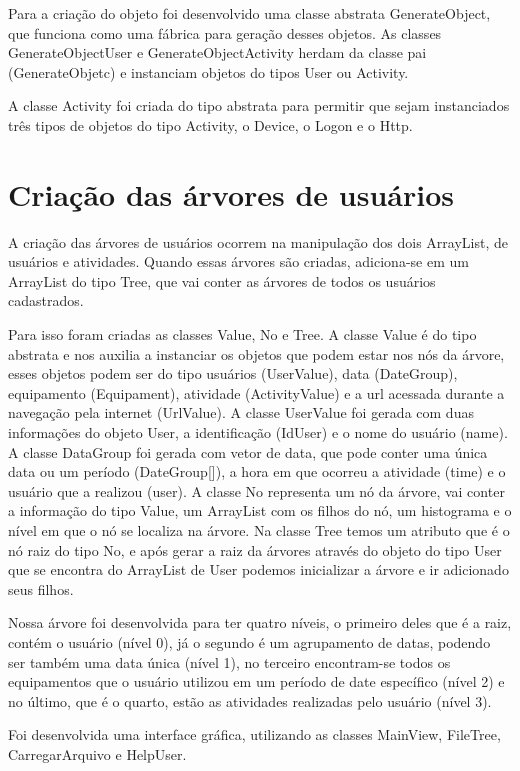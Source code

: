 \documentclass[12pt]{article}
\begin{document}
Para a criação do objeto foi desenvolvido uma classe abstrata GenerateObject, que funciona como uma fábrica para geração desses objetos. As classes GenerateObjectUser e GenerateObjectActivity herdam da classe pai (GenerateObjetc) e instanciam objetos do tipos User ou Activity.

A classe Activity foi criada do tipo abstrata para permitir que sejam instanciados três tipos de objetos do tipo Activity, o Device, o Logon e o Http.

\section{Criação das árvores de usuários}

A criação das árvores de usuários ocorrem na manipulação dos dois ArrayList, de usuários e atividades. Quando essas árvores são criadas, adiciona-se em um ArrayList do tipo Tree, que vai conter as árvores de todos os usuários cadastrados.

Para isso foram criadas as classes Value, No e Tree. A classe Value é do tipo abstrata e nos auxilia a instanciar os objetos que podem estar nos nós da árvore, esses objetos podem ser do tipo usuários (UserValue), data (DateGroup), equipamento (Equipament), atividade (ActivityValue) e a url acessada durante a navegação pela internet (UrlValue). 
A classe UserValue foi gerada com duas informações do objeto User, a identificação (IdUser) e o nome do usuário (name).
A classe DataGroup foi gerada com vetor de data, que pode conter uma única data ou um período (DateGroup[]), a hora em que ocorreu a atividade (time) e o usuário que a realizou (user).
A classe No representa um nó da árvore, vai conter a informação do tipo Value, um ArrayList com os filhos do nó, um histograma e o nível em que o nó se localiza na árvore.  
Na classe Tree temos um atributo que é o nó raiz do tipo No, e após gerar a raiz da árvores através do objeto do tipo User que se encontra do ArrayList de User podemos inicializar a árvore e ir adicionado seus filhos.

Nossa árvore foi desenvolvida para ter quatro níveis, o primeiro deles que é a raiz,  contém o usuário (nível 0), já o segundo é um agrupamento de datas, podendo ser também uma data única (nível 1), no terceiro encontram-se todos os equipamentos que o usuário utilizou em um período de date específico (nível 2) e no último, que é o quarto, estão as atividades realizadas pelo usuário (nível 3).

Foi desenvolvida uma interface gráfica, utilizando as classes MainView, FileTree, CarregarArquivo e HelpUser.
\end{document}

